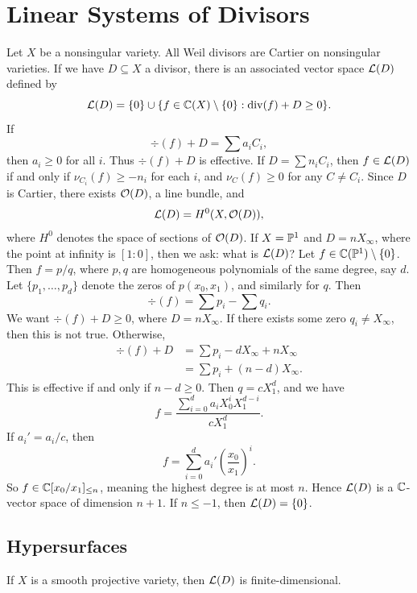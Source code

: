 
\section{Linear Systems of Divisors}

Let $X$ be a nonsingular variety.
All Weil divisors are Cartier on nonsingular varieties.
If we have $D \subseteq X$ a divisor, there is an associated vector space $\mathcal{L}(D)$ defined by
\[
    \mathcal{L}(D) = \{0\} \cup \{f \in \mathbb{C}(X)\setminus\{0\} : \mathrm{div}(f) + D \geq 0\}.
\]
If
\[
    \div(f) + D = \sum a_i C_i,
\]
then $a_i \geq 0$ for all $i$.
Thus $\div(f) + D$ is effective.
If $D = \sum n_i C_i$, then $f \in \mathcal{L}(D)$ if and only if $\nu_{C_i}(f) \geq -n_i$ for each $i$, and $\nu_C(f) \geq 0$ for any $C \neq C_i$.
Since $D$ is Cartier, there exists $\mathcal{O}(D)$, a line bundle, and
\[
    \mathcal{L}(D) = H^0(X,\mathcal{O}(D)),
\]
where $H^0$ denotes the space of sections of $\mathcal{O}(D)$.
If $X = \mathbb{P}^1$ and $D = nX_{\infty}$, where the point at infinity is $[1:0]$, then we ask: what is $\mathcal{L}(D)$?
Let $f \in \mathbb{C}(\mathbb{P}^1)\setminus\{0\}$.
Then $f = p/q$, where $p,q$ are homogeneous polynomials of the same degree, say $d$.
Let $\{p_1,\ldots,p_d\}$ denote the zeros of $p(x_0,x_1)$, and similarly for $q$.
Then
\[
    \div(f) = \sum p_i - \sum q_i.
\]
We want $\div(f) + D \geq 0$, where $D = nX_{\infty}$.
If there exists some zero $q_i \neq X_{\infty}$, then this is not true.
Otherwise,
\begin{align*}
    \div(f) + D &= \sum p_i - dX_{\infty} + nX_{\infty} \\
    &= \sum p_i + (n-d)X_{\infty}.
\end{align*}
This is effective if and only if $n-d \geq 0$.
Then $q = cX_1^d$, and we have
\[
    f = \frac{\sum_{i=0}^d a_i X_0^i X_1^{d-i}}{cX_1^d}.
\]
If $a_i' = a_i/c$, then
\[
    f = \sum_{i=0}^d a_i' \left(\frac{x_0}{x_1}\right)^i.
\]
So $f \in \mathbb{C}[x_0/x_1]_{\leq n}$, meaning the highest degree is at most $n$.
Hence $\mathcal{L}(D)$ is a $\mathbb{C}$-vector space of dimension $n+1$.
If $n \leq -1$, then $\mathcal{L}(D) = \{0\}$.

\subsection{Hypersurfaces}

\begin{theorem*}{
    If $X$ is a smooth projective variety, then $\mathcal{L}(D)$ is finite-dimensional.
}
\end{theorem*}

